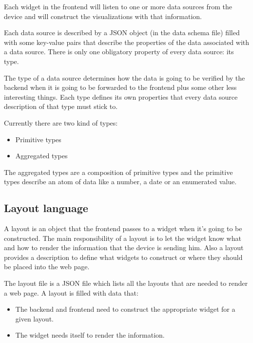 \documentclass[12pt]{article}
\begin{document}
            Each widget in the frontend will listen to one or more data sources
            from the device and will construct the visualizations with that
            information.

            Each data source is described by a JSON object (in the data schema
            file) filled with some key-value pairs that describe the properties
            of the data associated with a data source. There is only one
            obligatory property of every data source: its type.

            The type of a data source determines how the data is going to be
            verified by the backend when it is going to be forwarded to the
            frontend plus some other less interesting things. Each type defines
            its own properties that every data source description of that type
            must stick to.

            Currently there are two kind of types:

            \begin{itemize}
                \item Primitive types
                \item Aggregated types
            \end{itemize}

            The aggregated types are a composition of primitive types and the
            primitive types describe an atom of data like a number, a date or an
            enumerated value.

        \subsection{Layout language}
            A layout is an object that the frontend passes to a widget when it's
            going to be constructed. The main responsibility of a layout is to
            let the widget know what and how to render the information that the
            device is sending him. Also a layout provides a description to
            define what widgets to construct or where they should be placed into
            the web page.

            The layout file is a JSON file which lists all the layouts that
            are needed to render a web page. A layout is filled with data that:
            \begin{itemize}
                \item The backend and frontend need to construct the appropriate
                      widget for a given layout.
                \item The widget needs itself to render the information.
            \end{itemize}
\end{document}
